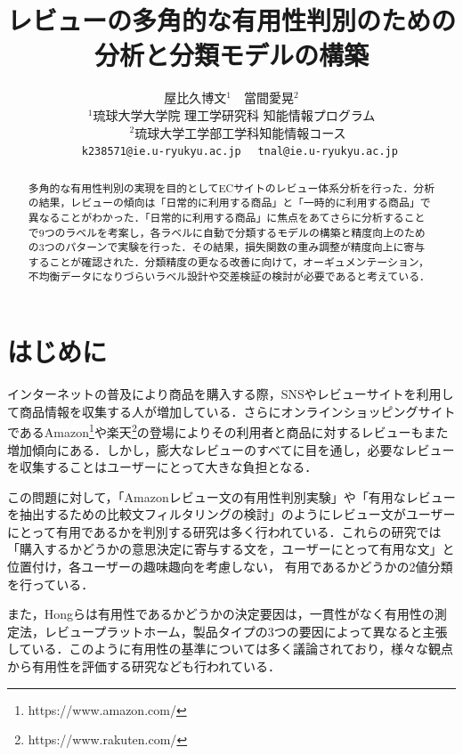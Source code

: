 \documentclass[
  platex, dvipdfmx,  %
]{nlp2024}
\title{レビューの多角的な有用性判別のための分析と分類モデルの構築}
\author{%
  屋比久博文${}^{1}$　當間愛晃${}^{2}$　\\
${}^{1}$琉球大学大学院 理工学研究科 知能情報プログラム\\
　${}^{2}$琉球大学工学部工学科知能情報コース\\
　 \texttt{k238571@ie.u-ryukyu.ac.jp}
　\texttt{tnal@ie.u-ryukyu.ac.jp}\\}
\begin{document}
\maketitle
\begin{abstract}
多角的な有用性判別の実現を目的としてECサイトのレビュー体系分析を行った．分析の結果，レビューの傾向は「日常的に利用する商品」と「一時的に利用する商品」で異なることがわかった．「日常的に利用する商品」に焦点をあてさらに分析することで9つのラベルを考案し，各ラベルに自動で分類するモデルの構築と精度向上のための3つのパターンで実験を行った．その結果，損失関数の重み調整が精度向上に寄与することが確認された．分類精度の更なる改善に向けて，オーギュメンテーション，不均衡データになりづらいラベル設計や交差検証の検討が必要であると考えている．

\end{abstract}

\section{はじめに}
インターネットの普及により商品を購入する際，SNSやレビューサイトを利用して商品情報を収集する人が増加している．さらにオンラインショッピングサイトであるAmazon\footnote{https://www.amazon.com/}や楽天\footnote{https://www.rakuten.com/}の登場によりその利用者と商品に対するレビューもまた増加傾向にある．しかし，膨大なレビューのすべてに目を通し，必要なレビューを収集することはユーザーにとって大きな負担となる．

この問題に対して，「Amazonレビュー文の有用性判別実験\cite{Article_02}」や「有用なレビューを抽出するための比較文フィルタリングの検討\cite{Article_03}」のようにレビュー文がユーザーにとって有用であるかを判別する研究は多く行われている．これらの研究では「購入するかどうかの意思決定に寄与する文を，ユーザーにとって有用な文」と位置付け，各ユーザーの趣味趣向を考慮しない，
有用であるかどうかの2値分類を行っている．

また，Hongらは有用性であるかどうかの決定要因は，一貫性がなく有用性の測定法，レビュープラットホーム，製品タイプの3つの要因によって異なると主張している\cite{Article_04}．このように有用性の基準については多く議論されており，様々な観点から有用性を評価する研究なども行われている．
\end{document}
